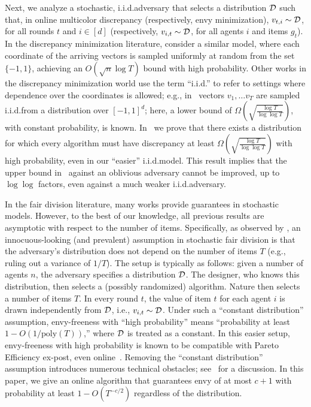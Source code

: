 Next, we analyze a stochastic, i.i.d.\@ adversary that selects a distribution $\mathcal{D}$ such that, in online multicolor discrepancy (respectively, envy minimization), $v_{t,i} \sim \mathcal{D}$, for all rounds $t$ and $i \in [d]$ (respectively, $v_{i,t} \sim \mathcal{D}$, for all agents $i$ and items $g_t$). In the discrepancy minimization literature, \citet{bansal2020line} consider a similar model, where each coordinate of the arriving vectors is sampled uniformly at random from the set $\{ -1, 1\}$, achieving an $O(\sqrt{n} \log T)$ bound with high probability. Other works in the discrepancy minimization world use the term ``i.i.d.'' to refer to settings where dependence over the coordinates is allowed; e.g., in~\cite{bansal2020online} vectors $v_1, \dots v_T$ are sampled i.i.d.\@ from a distribution over $[-1,1]^d$; here, a lower bound of $\Omega\left( \sqrt{\frac{\log T}{\log \log T}} \right)$, with constant probability, is known. In~ we prove that there exists a distribution for which every algorithm must have discrepancy at least $\Omega\left( \sqrt{\frac{\log T}{\log \log T}} \right)$ with high probability, even in our ``easier'' i.i.d.\@ model. This result implies that the upper bound in~ against an oblivious adversary cannot be improved, up to $\log\log$ factors, even against a much weaker i.i.d.\@ adversary.



In the fair division literature, many works provide guarantees in stochastic models. However, to the best of our knowledge, all previous results are asymptotic with respect to the number of items. Specifically, as observed by \citet{bansal2020online}, an innocuous-looking (and prevalent) assumption in stochastic fair division is that the adversary's distribution does not depend on the number of items $T$ (e.g., ruling out a variance of $1/T$). The setup is typically as follows: given a number of agents $n$, the adversary specifies a distribution $\mathcal{D}$. The designer, who knows this distribution, then selects a (possibly randomized) algorithm. Nature then selects a number of items $T$. In every round $t$, the value of item $t$ for each agent $i$ is drawn independently from $\mathcal{D}$, i.e., $v_{i,t} \sim \mathcal{D}$. Under such a ``constant distribution'' assumption, envy-freeness with ``high probability'' means ``probability at least $1 - O(1/\text{poly}(T))$,'' where $\mathcal{D}$ is treated as a constant. In this easier setup, envy-freeness with high probability is known to be compatible with Pareto Efficiency ex-post, even online~\cite{benade2024fair}. Removing the ``constant distribution'' assumption introduces numerous technical obstacles; see~ for a discussion. In this paper, we give an online algorithm that guarantees envy of at most $c+1$ with probability at least $1 - O(T^{-c/2})$ regardless of the distribution.







